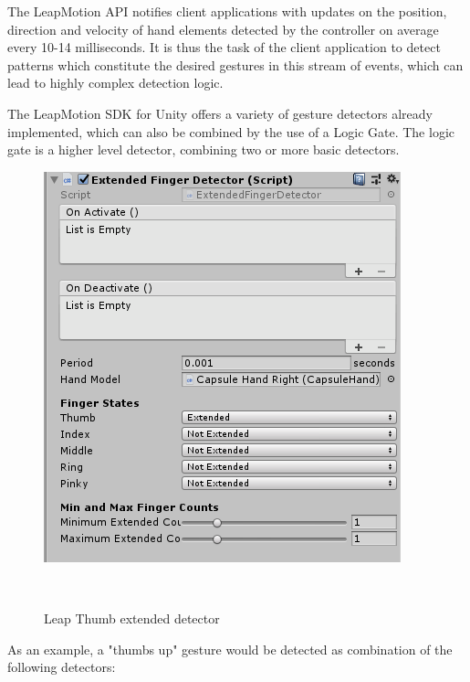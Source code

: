 \documentclass{sigchi}
\def\leap{LeapMotion}
\begin{document}
The \leap{} API notifies client applications with updates on the position, direction and velocity of hand elements detected by the controller on average every 10-14 milliseconds. It is thus the task of the client application to detect patterns which constitute the desired gestures in this stream of events, which can lead to highly complex detection logic.

The \leap{} SDK for Unity offers a variety of gesture detectors already implemented, which can also be combined by the use of a Logic Gate. The logic gate is a higher level detector, combining two or more basic detectors.

\begin{figure}[!t]
      \centering
      \includegraphics[width=0.7\columnwidth]{figures/ThumbExtendedDetector.png}
      \caption{Leap Thumb extended detector}~\label{fig:figure2}
\end{figure}

As an example, a "thumbs up" gesture would be detected as combination of the following detectors:
\end{document}
